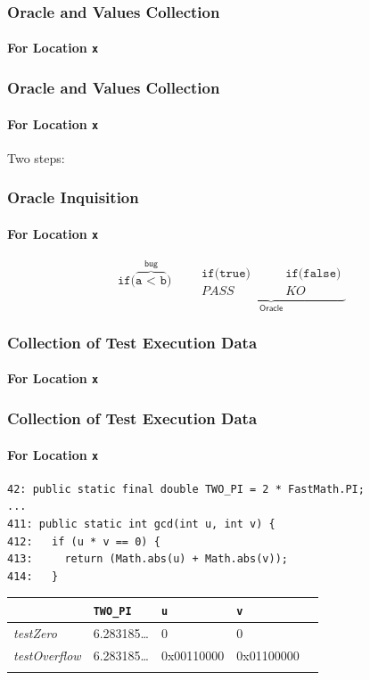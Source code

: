 \documentclass[onlymath]{beamer}
\begin{document}
\frame
{
  \frametitle{Oracle and Values Collection}
  \framesubtitle{For Location \texttt{x}}
  \begin{center}
  
  \end{center}
}

\frame
{
  \frametitle{Oracle and Values Collection}
  \framesubtitle{For Location \texttt{x}}
  Two steps:
  \begin{center}
  
  \end{center}
}

\begin{frame}
  \frametitle{Oracle Inquisition}
  \framesubtitle{For Location \texttt{x}}
 \begin{equation*}
  \texttt{if(}\overbrace{\texttt{a < b}}^{\displaystyle \textsf{bug}}\texttt{)} \qquad \underbrace{\begin{align*}
                                         \texttt{if(true)} \quad & \quad \texttt{if(false)} \\
                                         PASS \quad & \quad KO
                                        \end{align*} }_{\displaystyle \textsf{Oracle}}
 \end{equation*}
\end{frame}

\frame
{
  \frametitle{Collection of Test Execution Data}
  \framesubtitle{For Location \texttt{x}}
  \begin{center}
  
  \end{center}
}


\begin{frame}[fragile]
  \frametitle{Collection of Test Execution Data}
  \framesubtitle{For Location \texttt{x}}
\begin{lstlisting}[basicstyle=\footnotesize]
 42: public static final double TWO_PI = 2 * FastMath.PI;
...
411: public static int gcd(int u, int v) {
412:   if (u * v == 0) {
413:     return (Math.abs(u) + Math.abs(v));
414:   }
\end{lstlisting}

\begin{center}
\begin{tabular}{|l|l|l|l|l}
\hline
 & \texttt{TWO\_PI} & \texttt{u} & \texttt{v} & \\
\hline
\textit{testZero} & 6.283185\dots & 0 & 0 & \\
\hline
\textit{testOverflow} & 6.283185\dots & 0x00110000 & 0x01100000 & \\
\hline
 & & & & \\
\end{tabular}
\end{center}
\end{frame}
\end{document}
